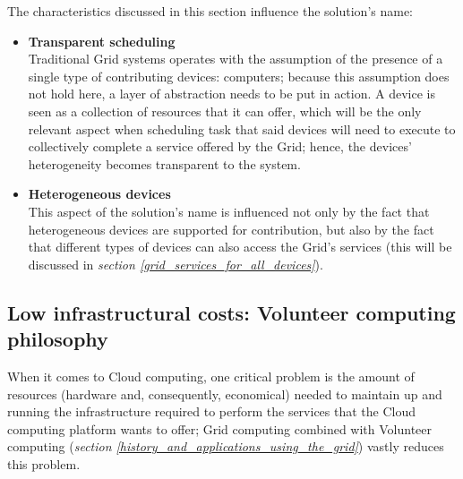 The characteristics discussed in this section influence the solution's name:
\begin{itemize}
    \item \textbf{Transparent scheduling}\\
    Traditional Grid systems operates with the assumption of the presence of a single type of contributing devices: computers; because this assumption does not hold here, a layer of abstraction needs to be put in action. A device is seen as a collection of resources that it can offer, which will be the only relevant aspect when scheduling task that said devices will need to execute to collectively complete a service offered by the Grid; hence, the devices' heterogeneity becomes transparent to the system.
    \item \textbf{Heterogeneous devices}\\
    This aspect of the solution's name is influenced not only by the fact that heterogeneous devices are supported for contribution, but also by the fact that different types of devices can also access the Grid's services (this will be discussed in \textit{section \ref{grid_services_for_all_devices}}).
\end{itemize}

\subsection{Low infrastructural costs: Volunteer computing philosophy}
When it comes to Cloud computing, one critical problem is the amount of resources (hardware and, consequently, economical) needed to maintain up and running the infrastructure required to perform the services that the Cloud computing platform wants to offer; Grid computing combined with Volunteer computing (\textit{section \ref{history_and_applications_using_the_grid}}) vastly reduces this problem.


